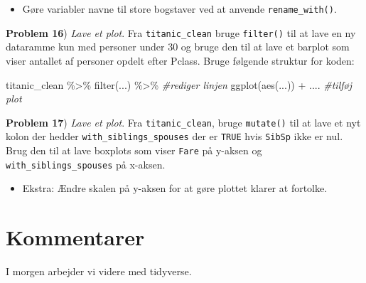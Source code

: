 \documentclass[
]{book}
\newenvironment{Shaded}{\begin{snugshade}}{\end{snugshade}}
\newcommand{\CommentTok}[1]{\textcolor[rgb]{0.56,0.35,0.01}{\textit{#1}}}
\newcommand{\FunctionTok}[1]{\textcolor[rgb]{0.00,0.00,0.00}{#1}}
\newcommand{\NormalTok}[1]{#1}
\newcommand{\SpecialCharTok}[1]{\textcolor[rgb]{0.00,0.00,0.00}{#1}}
\providecommand{\tightlist}{%
  \setlength{\itemsep}{0pt}\setlength{\parskip}{0pt}}
\begin{document}
\begin{itemize}
\tightlist
\item
  Gøre variabler navne til store bogstaver ved at anvende \texttt{rename\_with()}.
\end{itemize}

\textbf{Problem 16}) \emph{Lave et plot}. Fra \texttt{titanic\_clean} bruge \texttt{filter()} til at lave en ny dataramme kun med personer under 30 og bruge den til at lave et barplot som viser antallet af personer opdelt efter Pclass. Bruge følgende struktur for koden:

\begin{Shaded}
\begin{Highlighting}[]
\NormalTok{titanic\_clean }\SpecialCharTok{\%\textgreater{}\%} 
  \FunctionTok{filter}\NormalTok{(...) }\SpecialCharTok{\%\textgreater{}\%} \CommentTok{\#rediger linjen}
  \FunctionTok{ggplot}\NormalTok{(}\FunctionTok{aes}\NormalTok{(...)) }\SpecialCharTok{+}\NormalTok{ .... }\CommentTok{\#tilføj plot}
\end{Highlighting}
\end{Shaded}

\textbf{Problem 17}) \emph{Lave et plot}. Fra \texttt{titanic\_clean}, bruge \texttt{mutate()} til at lave et nyt kolon der hedder \texttt{with\_siblings\_spouses} der er \texttt{TRUE} hvis \texttt{SibSp} ikke er nul. Brug den til at lave boxplots som viser \texttt{Fare} på y-aksen og \texttt{with\_siblings\_spouses} på x-aksen.

\begin{itemize}
\tightlist
\item
  Ekstra: Ændre skalen på y-aksen for at gøre plottet klarer at fortolke.
\end{itemize}

\hypertarget{kommentarer}{%
\section{Kommentarer}\label{kommentarer}}

I morgen arbejder vi videre med tidyverse.

  
\end{document}
